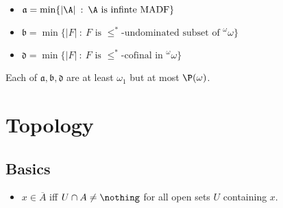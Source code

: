 \documentclass{article}
\begin{document}
\begin{defn}
    \leavevmode
    \begin{itemize}
        \item \(\mathfrak{a} = \min\{|\A| \: : \: \A \text{ is infinte } \text{MADF}\}\)
        \item \(\mathfrak{b} = \min\{|F| \: : \: F \text{ is } \leq^{\ast}\text{-undominated subset of }^\omega\omega\}\)
        \item \(\mathfrak{d} = \min\{|F| \: : \: F \text{ is } \leq^{\ast}\text{-cofinal in } ^\omega\omega
        \}\)
    \end{itemize}
    Each of \(\mathfrak{a}, \mathfrak{b}, \mathfrak{d}\) are at least \(\omega_1\) but at most \(\P(\omega)\).
\end{defn}


\section{Topology}

\subsection{Basics}
\begin{itemize}
    \item \(x \in \overline{A}\) iff \(U\cap A \neq \nothing\) for all open sets \(U\) containing \(x\).
\end{itemize}
    
\end{document}
